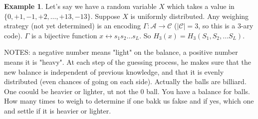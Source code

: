 \documentclass{report}
\theoremstyle{plain}
\theoremstyle{definition}
\newtheorem{exmp}[thm]{Example}
\theoremstyle{remark}
\begin{document}
 \begin{exmp}
 	Let's say we have a random variable $X$ which takes a value in $\{0, +1, -1, +2, \ldots, +13, -13\}$. Suppose $X$ is uniformly distributed. Any weighing strategy (not yet determined) is an encoding $\Gamma: \mathcal A \to \mathcal C$ ($|\mathcal C| = 3$, so this is a $3$-ary code). $\Gamma$ is a bijective function $x \leftrightarrow s_1 s_2\ldots s_L$. So $H_3(x) = H_3(S_1, S_2, \ldots S_L)$.
 \end{exmp}
NOTES: a negative number means "light" on the balance, a positive number means it is "heavy". At each step of the guessing process, he makes sure that the new balance is independent of previous knowledge, and that it is evenly distributed (even chances of going on each side). Actually the balls are billiard.
 One coould be heavier or lighter, ut not the 0 ball. You have a balance for balls. How many times to weigh to determine if one bakk us fakse and if yes, which one and settle if it is heavier or lighter.
\end{document}
